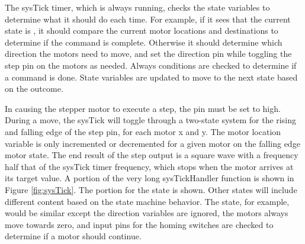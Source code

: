 \documentclass[11pt]{LaTeX-Classes/math-hw}
\begin{document}
The sysTick timer, which is always running, checks the state variables to determine what it should
do each time. For example, if it sees that the current state is , it should compare the current
motor locations and destinations to determine if the command is complete. Otherwise it should
determine which direction the motors need to move, and set the direction pin while toggling
the step pin on the motors as needed.
Always conditions are checked to determine if a command is done.
State variables are updated to move to the next state based on the outcome.

In causing the stepper motor to execute a step, the  pin must be set to high.
During a move, the sysTick will toggle through a two-state system for the rising and falling
edge of the step pin, for each motor x and y. The motor location variable
is only incremented or decremented
for a given motor on the falling edge motor state.
The end result of the step output is a square wave with a frequency half that
of the sysTick timer frequency, which stops when the motor arrives at its target value.
A portion of the very long sysTickHandler function is shown in Figure \ref{fig:sysTick}.
The portion for the  state is shown. Other states will include different content
based on the state machine behavior. The  state, for example, would be similar
except the direction variables are ignored, the motors always move towards zero, and input
pins for the homing switches are checked to determine if a motor should continue.
\end{document}
